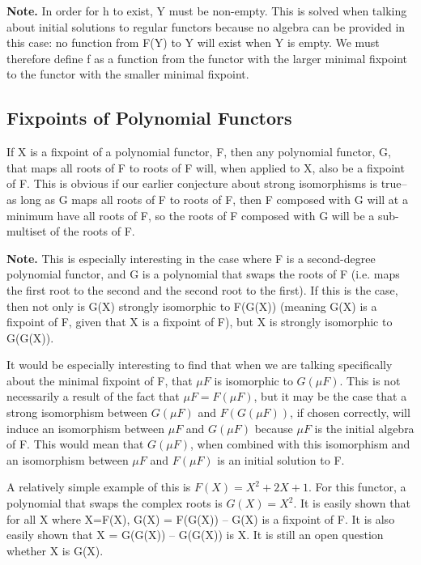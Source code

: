\documentclass[letterpaper,numbers=enddot]{scrartcl}
\begin{document}
\textbf{Note. } In order for h to exist, Y must be non-empty.  This is solved when talking about initial solutions to regular functors because no algebra can be provided in this case: no function from F(Y) to Y will exist when Y is empty.  We must therefore define f as a function from the functor with the larger minimal fixpoint to the functor with the smaller minimal fixpoint.

\subsection{Fixpoints of Polynomial Functors}

If X is a fixpoint of a polynomial functor, F, then any polynomial functor, G, that maps all roots of F to roots of F will, when applied to X, also be a fixpoint of F.  This is obvious if our earlier conjecture about strong isomorphisms is true--as long as G maps all roots of F to roots of F, then F composed with G will at a minimum have all roots of F, so the roots of F composed with G will be a sub-multiset of the roots of F.

\textbf{Note. } This is especially interesting in the case where F is a second-degree polynomial functor, and G is a polynomial that swaps the roots of F (i.e. maps the first root to the second and the second root to the first).  If this is the case, then not only is G(X) strongly isomorphic to F(G(X)) (meaning G(X) is a fixpoint of F, given that X is a fixpoint of F), but X is strongly isomorphic to G(G(X)).

\indent It would be especially interesting to find that when we are talking specifically about the minimal fixpoint of F, that $\mu F$ is isomorphic to $G(\mu F)$.  This is not necessarily a result of the fact that $\mu F = F(\mu F)$, but it may be the case that a strong isomorphism between $G(\mu F)$ and $F(G(\mu F))$, if chosen correctly, will induce an isomorphism between $\mu F$ and $G(\mu F)$ because $\mu F$ is the initial algebra of F.  This would mean that $G(\mu F)$, when combined with this isomorphism and an isomorphism between $\mu F$ and $F(\mu F)$ is an initial solution to F.

\indent A relatively simple example of this is $F(X)=X^2+2X+1$.  For this functor, a polynomial that swaps the complex roots is $G(X)=X^2$.  It is easily shown that for all X where X=F(X), G(X) = F(G(X)) -- G(X) is a fixpoint of F.  It is also easily shown that X = G(G(X)) -- G(G(X)) is X.  It is still an open question whether X is G(X).
\end{document}
